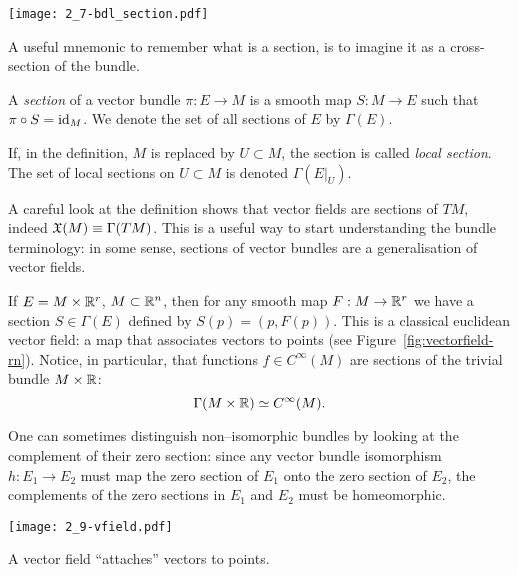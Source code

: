\begin{marginfigure}
  \texttt{[image: 2\_7-bdl\_section.pdf]}
  \caption{A useful mnemonic to remember what is a section, is to imagine it as a cross-section of the bundle.}
\end{marginfigure}

\begin{definition}
  A \emph{section} of a vector bundle $\pi:E \to M$ is a smooth map $S:M \to E$ such that $\pi\circ S = \operatorname{id}_M$. We denote the set of all sections of $E$ by $\Gamma(E)$.

  If, in the definition, $M$ is replaced by $U\subset M$, the section is called \emph{local section}. The set of local sections on $U\subset M$ is denoted $\Gamma(E|_U)$.
\end{definition}

\begin{remark}
  A careful look at the definition shows that vector fields are sections of $TM$, indeed $\mathfrak{X}(M) \equiv \Gamma(TM)$.
  This is a useful way to start understanding the bundle terminology: in some sense, sections of vector bundles are a generalisation of vector fields.
\end{remark}

\begin{example}
If $E = M\times \mathbb{R}^r$, $M\subset\mathbb{R}^n$, then for any smooth map $F: M\to\mathbb{R}^r$ we have a section $S\in\Gamma(E)$ defined by $S(p) = (p, F(p))$. This is a classical euclidean vector field: a map that associates vectors to points (see Figure~\ref{fig:vectorfield-rn}).
  Notice, in particular, that functions $f\in C^\infty(M)$ are sections of the trivial bundle $M\times\mathbb{R}$:
  \begin{equation}
    \Gamma(M\times\mathbb{R}) \simeq C^\infty(M).
  \end{equation}
\end{example}

One can sometimes distinguish non--isomorphic bundles by looking at the complement of their zero section: since any vector bundle isomorphism $h:E_1\to E_2$ must map the zero section of $E_1$ onto the zero section of $E_2$, the complements of the zero sections in $E_1$ and $E_2$ must be homeomorphic.

\begin{marginfigure}
    \texttt{[image: 2\_9-vfield.pdf]}
    \caption{A vector field ``attaches'' vectors to points.}%
    \label{fig:vectorfield-rn}
\end{marginfigure}

